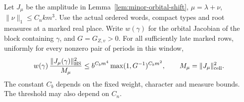 \begin{auxlemma}
\label{lem:unit-cell-evaluation}
Let \(J_\mu\) be the amplitude in Lemma~\ref{lem:minor-orbital-shift},
\(\mu=\lambda+\nu\), \(\|\nu\|_1\le C_nkm^3\).
Use the actual ordered words, compact types and root measures at a
marked real place. Write \(w(\gamma)\) for the orbital Jacobian of
the block containing \(\gamma\), and \(G=G_{Z,v}>0\).
For all sufficiently late marked rows, uniformly for every nonzero
pair of periods in this window,
\begin{equation}\label{eq:unweighted-unit-cell-evaluation}
 w(\gamma)\,\frac{\|J_\mu(\gamma)\|_{\rm HS}^2}{M_\mu}
       \le b^{C_bm^4}\max(1,G^{-1})^{C_bm^2},
 \qquad M_\mu=\|J_\mu\|_{\rm cell}^2 .
\end{equation}
The constant \(C_b\) depends on the fixed weight, character and
measure bounds. The threshold may also depend on \(C_n\).
\end{auxlemma}


